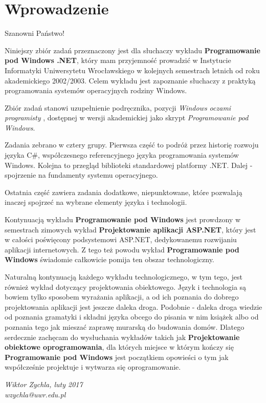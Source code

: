 ﻿\chapter*{Wprowadzenie}

Szanowni Państwo!

Niniejszy zbiór zadań przeznaczony jest dla słuchaczy wykładu
{\bf Programowanie pod Windows .NET}, który mam przyjemność prowadzić 
w Instytucie Informatyki Uniwersytetu Wrocławskiego w kolejnych semestrach letnich
od roku akademickiego 2002/2003.
Celem wykładu jest zapoznanie słuchaczy z praktyką programowania systemów operacyjnych rodziny Windows.

Zbiór zadań stanowi uzupełnienie podręcznika,
pozycji {\em Windows oczami programisty} \cite{WZWOP}, 
dostępnej w wersji akademickiej jako skrypt {\em Programowanie pod Windows}.

Zadania zebrano w cztery grupy. 
Pierwsza część to podróż przez historię rozwoju języka C\#, współczesnego referencyjnego języka programowania systemów Windows.
Kolejna to przegląd biblioteki standardowej platformy .NET. 
Dalej - spojrzenie na fundamenty systemu operacyjnego. 

Ostatnia część zawiera zadania dodatkowe, niepunktowane, które pozwalają 
inaczej spojrzeć na wybrane elementy języka i technologii.

Kontynuacją wykładu {\bf Programowanie pod Windows} jest prowdzony w semestrach zimowych
wykład {\bf Projektowanie aplikacji ASP.NET}, który jest 
w całości poświęcony podsystemowi ASP.NET, dedykowanemu rozwijaniu aplikacji internetowych. Z tego też powodu wykład 
{\bf Programowanie pod Windows} świadomie całkowicie pomija ten obszar technologiczny.

Naturalną kontynuacją każdego wykładu technologicznego, w tym tego, jest również wykład dotyczący projektowania obiektowego. Język i technologia są
bowiem tylko sposobem wyrażania aplikacji, a od ich poznania do dobrego projektowania aplikacji jest jeszcze daleka droga. Podobnie -
daleka droga wiedzie od poznania gramatyki i składni języka obcego do pisania w nim książek albo od poznania tego jak mieszać zaprawę murarską do budowania domów.
Dlatego serdecznie zachęcam do wysłuchania wykładów takich jak {\bf Projektowanie obiektowe oprogramowania}, dla których miejsce w którym kończy się {\bf Programowanie pod Windows} jest 
początkiem opowieści o tym jak współcześnie projektuje i wytwarza się oprogramowanie.

\vspace{1cm}
\hfill{\em Wiktor Zychla, luty 2017}\\
\vspace{1cm}
\hfill{\em wzychla@uwr.edu.pl}

